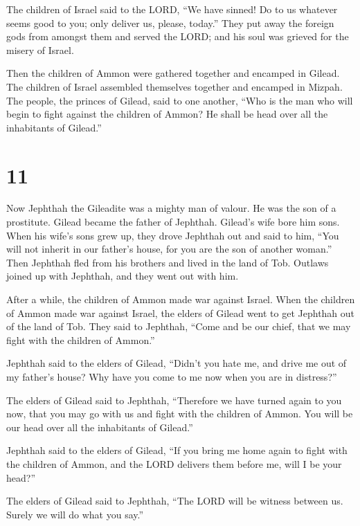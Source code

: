  The children of Israel said to the LORD, ``We have
sinned! Do to us whatever seems good to you; only deliver us, please,
today.''  They put away the foreign gods from amongst
them and served the LORD; and his soul was grieved for the misery of
Israel.

 Then the children of Ammon were gathered together and
encamped in Gilead. The children of Israel assembled themselves together
and encamped in Mizpah.  The people, the princes of
Gilead, said to one another, ``Who is the man who will begin to fight
against the children of Ammon? He shall be head over all the inhabitants
of Gilead.''

\hypertarget{section-10}{%
\section{11}\label{section-10}}

 Now Jephthah the Gileadite was a mighty man of valour. He
was the son of a prostitute. Gilead became the father of Jephthah.
 Gilead's wife bore him sons. When his wife's sons grew
up, they drove Jephthah out and said to him, ``You will not inherit in
our father's house, for you are the son of another woman.''
 Then Jephthah fled from his brothers and lived in the
land of Tob. Outlaws joined up with Jephthah, and they went out with
him.

 After a while, the children of Ammon made war against
Israel.  When the children of Ammon made war against
Israel, the elders of Gilead went to get Jephthah out of the land of
Tob.  They said to Jephthah, ``Come and be our chief, that
we may fight with the children of Ammon.''

 Jephthah said to the elders of Gilead, ``Didn't you hate
me, and drive me out of my father's house? Why have you come to me now
when you are in distress?''

 The elders of Gilead said to Jephthah, ``Therefore we
have turned again to you now, that you may go with us and fight with the
children of Ammon. You will be our head over all the inhabitants of
Gilead.''

 Jephthah said to the elders of Gilead, ``If you bring me
home again to fight with the children of Ammon, and the LORD delivers
them before me, will I be your head?''

 The elders of Gilead said to Jephthah, ``The LORD will
be witness between us. Surely we will do what you say.''

